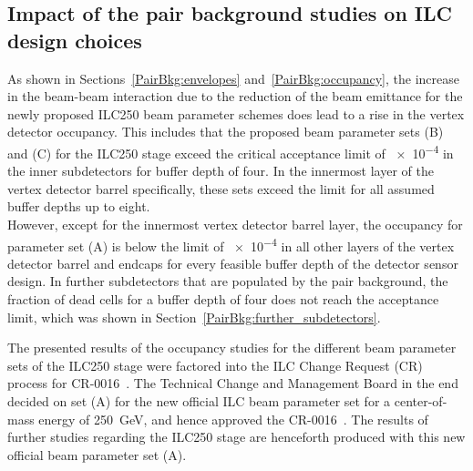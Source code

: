 \subsection{Impact of the pair background studies on ILC design choices}
As shown in Sections~\ref{PairBkg:envelopes} and~\ref{PairBkg:occupancy}, the increase in the beam-beam interaction due to the reduction of the beam emittance for the newly proposed ILC250 beam parameter schemes does lead to a rise in the \sid vertex detector occupancy.
This includes that the proposed beam parameter sets (B) and (C) for the ILC250 stage exceed the critical acceptance limit of \num{e-4} in the inner subdetectors for buffer depth of four. 
In the innermost layer of the vertex detector barrel specifically, these sets exceed the limit for all assumed buffer depths up to eight.
\\However, except for the innermost vertex detector barrel layer, the occupancy for parameter set (A) is below the limit of \num{e-4} in all other layers of the vertex detector barrel and endcaps for every feasible buffer depth of the detector sensor design.
In further \sid subdetectors that are populated by the pair background, the fraction of dead cells for a buffer depth of four does not reach the acceptance limit, which was shown in Section~\ref{PairBkg:further_subdetectors}.

The presented results of the \sid occupancy studies for the different beam parameter sets of the ILC250 stage were factored into the ILC Change Request (CR) process for CR-0016~\cite{CR-0016}.
The Technical Change and Management Board in the end decided on set (A) for the new official ILC beam parameter set for a center-of-mass energy of \SI{250}{\GeV}, and hence approved the CR-0016~\cite{LCWS17_TCMBmeeting}.
The results of further studies regarding the ILC250 stage are henceforth produced with this new official beam parameter set (A).

